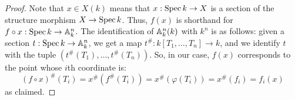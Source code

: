 \begin{proof}
	Note that $x \in X(k)$ means that $x : \Spec k \to X$ is a section of the structure morphism $X \to \Spec k$. Thus, $f(x)$ is shorthand for $f \circ x : \Spec k \to \AA_k^n$. The identification of $\AA_k^n(k)$ with $k^n$ is as follows: given a section $t : \Spec k \to \AA_k^n$, we get a map $t^\# : k[T_1,\ldots,T_n] \to k$, and we identify $t$ with the tuple $(t^\#(T_1),\ldots,t^\#(T_n))$. So, in our case, $f(x)$ corresponds to the point whose $i$th coordinate is:
	\[ (f \circ x)^\#(T_i) = x^\#(f^\#(T_i)) = x^\#(\varphi(T_i)) = x^\#(f_i) = f_i(x) \]
	as claimed.
\end{proof}
